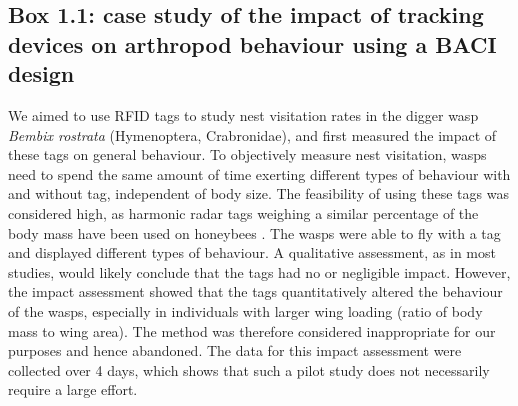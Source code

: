 \documentclass[10pt, twoside]{book} %
\begin{document}
	\begin{tcolorbox}[box, breakable, boxrule=1pt,toprule at break=1pt,extras={toprule at break=1pt}]
		\subsection*{Box 1.1: case study of the impact of tracking devices on arthropod behaviour using a BACI design}
		We aimed to use RFID tags to study nest visitation rates in the digger wasp \textit{Bembix rostrata} (Hymenoptera, Crabronidae), and first measured the impact of these tags on general behaviour. To objectively measure nest visitation, wasps need to spend the same amount of time exerting different types of behaviour with and without tag, independent of body size. The feasibility of using these tags was considered high, as harmonic radar tags weighing a similar percentage of the body mass have been used on honeybees \citep{capaldi2000}. The wasps were able to fly with a tag and displayed different types of behaviour. A qualitative assessment, as in most studies, would likely conclude that the tags had no or negligible impact. However, the impact assessment showed that the tags quantitatively altered the behaviour of the wasps, especially in individuals with larger wing loading (ratio of body mass to wing area). The method was therefore considered inappropriate for our purposes and hence abandoned. The data for this impact assessment were collected over 4 days, which shows that such a pilot study does not necessarily require a large effort.\\
		

\end{tcolorbox}
\end{document}
